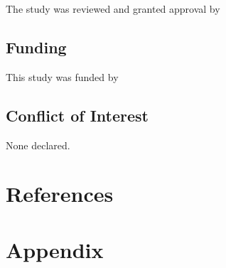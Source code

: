 \documentclass{article}
\begin{document}
The study was reviewed and granted approval by

\hypertarget{funding}{%
\subsection*{Funding}\label{funding}}

This study was funded by

\hypertarget{conflict-of-interest}{%
\subsection*{Conflict of Interest}\label{conflict-of-interest}}

None declared.

\newpage

\hypertarget{references}{%
\section*{References}\label{references}}

\hypertarget{refs}{}

\newpage
\appendix
{}

\hypertarget{appendix}{%
\section{Appendix}\label{appendix}}



\end{document}
